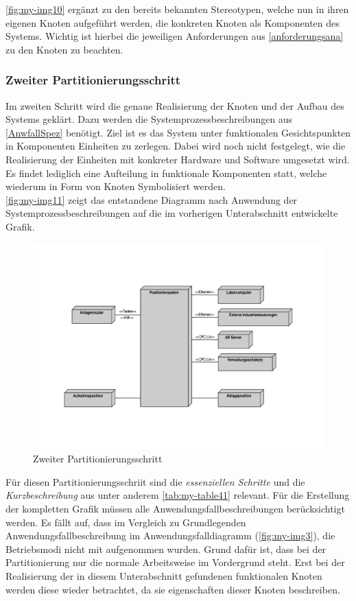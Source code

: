 \documentclass[../Bachelorarbeit.tex]{subfiles}
\begin{document}
\autoref{fig:my-img10} ergänzt zu den bereits bekannten Stereotypen, welche nun in ihren eigenen Knoten aufgeführt werden, die konkreten Knoten als Komponenten des Systems. Wichtig ist hierbei die jeweiligen Anforderungen aus \autoref{anforderungsana} zu den Knoten zu beachten.

\subsubsection{Zweiter Partitionierungsschritt}
Im zweiten Schritt wird die genaue Realisierung der Knoten und der Aufbau des Systems geklärt. Dazu werden die Systemprozessbeschreibungen aus \autoref{AnwfallSpez} benötigt. Ziel ist es das System unter funktionalen Gesichtspunkten in Komponenten \bzw Einheiten zu zerlegen. Dabei wird noch nicht festgelegt, wie die Realisierung der Einheiten mit konkreter Hardware und Software umgesetzt wird. Es findet lediglich eine Aufteilung in funktionale Komponenten statt, welche wiederum in Form von Knoten Symbolisiert werden. \\
\autoref{fig:my-img11} zeigt das entstandene Diagramm nach Anwendung der Systemprozessbeschreibungen auf die im vorherigen Unterabschnitt entwickelte Grafik. 

\begin{figure}[H]
    \centering
    \includegraphics[width=\textwidth]{Images/phys_abgrenzung.pdf}
    \caption[Zweiter Partitionierungsschritt]{Zweiter Partitionierungsschritt}
    \label{fig:my-img11}
\end{figure}

Für diesen Partitionierungsschriit sind die \textit{essenziellen Schritte} und die \textit{Kurzbeschreibung} aus unter anderem \autoref{tab:my-table41} relevant. Für die Erstellung der kompletten Grafik müssen alle Anwendungsfallbeschreibungen berücksichtigt werden. Es fällt auf, dass im Vergleich zu Grundlegenden Anwendungsfallbeschreibung im Anwendungsfalldiagramm (\autoref{fig:my-img3}), die Betriebsmodi nicht mit aufgenommen wurden. Grund dafür ist, dass bei der Partitionierung nur die normale Arbeitsweise im Vordergrund steht. Erst bei der Realisierung der in diesem Unterabschnitt gefundenen funktionalen Knoten werden diese wieder betrachtet, da sie eigenschaften dieser Knoten beschreiben.\\
\end{document}
